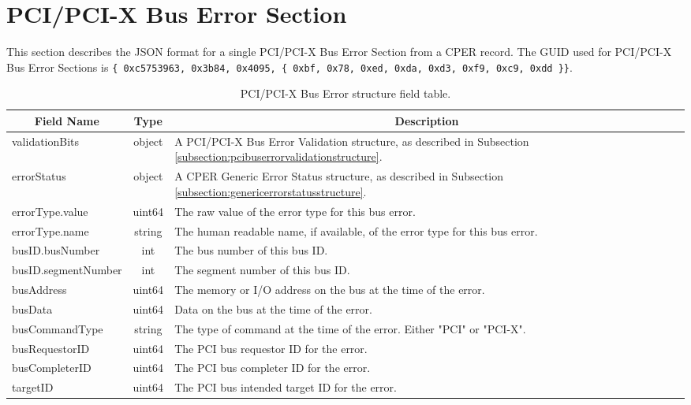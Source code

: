 \documentclass{report}
\newcommand*{\thead}[1]{\multicolumn{1}{|c|}{\bfseries #1}}
\newcommand*{\jsontable}[1]{
    \begin{table}[!ht]
    \label{#1}
    \centering
    \begin{adjustbox}{center}
    \begin{tabular}{|l|c|p{8cm}|}
    \hline
    \thead{Field Name} & \thead{Type} & \thead{Description} \\
    \hline
}
\newcommand*{\jsontableend}[1]{
    \hline
    \end{tabular}
    \end{adjustbox}
    \caption{#1}
    \label{table:#1}
    \end{table}
    \FloatBarrier
}
\begin{document}
\section{PCI/PCI-X Bus Error Section}
\label{section:pcibuserrorsection}
This section describes the JSON format for a single PCI/PCI-X Bus Error Section from a CPER record. The GUID used for PCI/PCI-X Bus Error Sections is \texttt{\{ 0xc5753963, 0x3b84, 0x4095, \{ 0xbf, 0x78, 0xed, 0xda, 0xd3, 0xf9, 0xc9, 0xdd \}\}}.
\jsontable{table:pcibuserrorsection}
validationBits & object & A PCI/PCI-X Bus Error Validation structure, as described in Subsection \ref{subsection:pcibuserrorvalidationstructure}.\\
\hline
errorStatus & object & A CPER Generic Error Status structure, as described in Subsection \ref{subsection:genericerrorstatusstructure}.\\
\hline
errorType.value & uint64 & The raw value of the error type for this bus error.\\
errorType.name & string & The human readable name, if available, of the error type for this bus error.\\
\hline
busID.busNumber & int & The bus number of this bus ID.\\
busID.segmentNumber & int & The segment number of this bus ID.\\
\hline
busAddress & uint64 & The memory or I/O address on the bus at the time of the error.\\
\hline
busData & uint64 & Data on the bus at the time of the error.\\
\hline
busCommandType & string & The type of command at the time of the error. Either "PCI" or "PCI-X".\\
\hline
busRequestorID & uint64 & The PCI bus requestor ID for the error.\\
\hline
busCompleterID & uint64 & The PCI bus completer ID for the error.\\
\hline
targetID & uint64 & The PCI bus intended target ID for the error.\\
\jsontableend{PCI/PCI-X Bus Error structure field table.}

\end{document}
